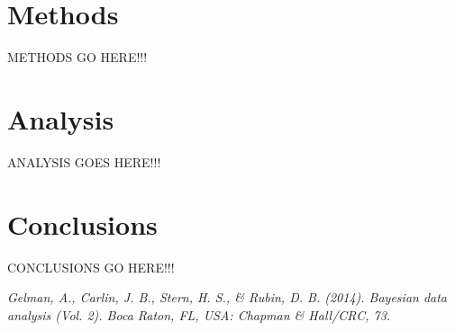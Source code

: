 \documentclass{../../tex_template/asaproc}
\begin{document}
\section{Methods}
METHODS GO HERE!!!

\section{Analysis}
ANALYSIS GOES HERE!!!

\section{Conclusions}
CONCLUSIONS GO HERE!!!

\begin{references}
{\footnotesize
\itemsep=3pt
\item {\em Gelman, A., Carlin, J. B., Stern, H. S., \& Rubin, D. B. (2014). Bayesian data analysis (Vol. 2). Boca Raton, FL, USA: Chapman \& Hall/CRC, 73.}
}

\end{references}
\end{document}

